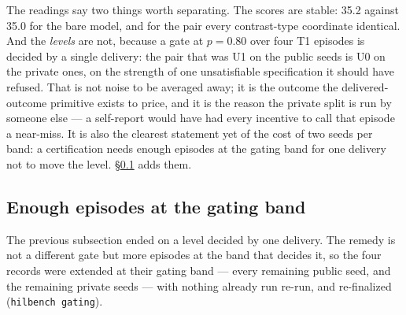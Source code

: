 \documentclass[11pt]{article}
\theoremstyle{definition}
\begin{document}
The readings say two things worth separating. The scores are stable: 35.2 against 35.0 for the bare model, and for the pair every contrast-type coordinate identical. And the \emph{levels} are not, because a gate at $p = 0.80$ over four T1 episodes is decided by a single delivery: the pair that was U1 on the public seeds is U0 on the private ones, on the strength of one unsatisfiable specification it should have refused. That is not noise to be averaged away; it is the outcome the delivered-outcome primitive exists to price, and it is the reason the private split is run by someone else --- a self-report would have had every incentive to call that episode a near-miss. It is also the clearest statement yet of the cost of two seeds per band: a certification needs enough episodes at the gating band for one delivery not to move the level. \S\ref{sec:gating} adds them.

\subsection{Enough episodes at the gating band}\label{sec:gating}

The previous subsection ended on a level decided by one delivery. The remedy is not a different gate but more episodes at the band that decides it, so the four records were extended at their gating band --- every remaining public seed, and the remaining private seeds --- with nothing already run re-run, and re-finalized (\texttt{hilbench gating}).
\end{document}
